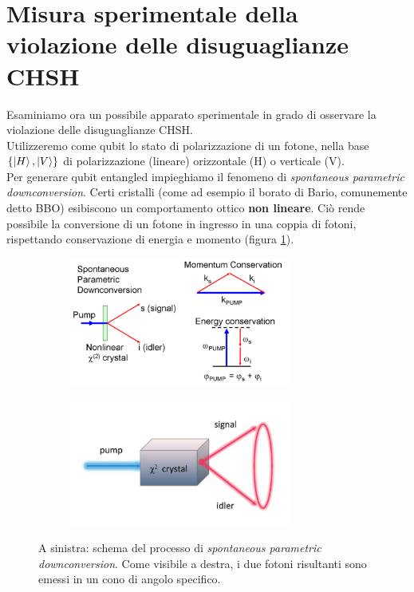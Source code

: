 \documentclass[../../InformazioneQuantistica.tex]{subfiles}
\begin{document}
\section{Misura sperimentale della violazione delle disuguaglianze CHSH}
Esaminiamo ora un possibile apparato sperimentale in grado di osservare la violazione delle disuguaglianze CHSH.\\
Utilizzeremo come qubit lo stato di polarizzazione di un fotone, nella base $\{\Ket{H},\Ket{V}\}$ di polarizzazione (lineare) orizzontale (H) o verticale (V).\\
Per generare qubit entangled impieghiamo il fenomeno di \textit{spontaneous parametric downconversion}. Certi cristalli (come ad esempio il borato di Bario, comunemente detto BBO) esibiscono un comportamento ottico \textbf{non lineare}. Ciò rende possibile la conversione di un fotone in ingresso in una coppia di fotoni, rispettando conservazione di energia e momento (figura \ref{fig:spdc}).

\begin{figure}[H]
    \centering
    \begin{subfigure}[t]{0.5\textwidth}
        \centering
        \includegraphics[width=0.8\textwidth]{Immagini/28_3/spdc_1.PNG}
    \end{subfigure}%
    \begin{subfigure}[t]{0.5\textwidth}
        \centering
        \includegraphics[width=0.8\textwidth]{Immagini/28_3/spdc_2.PNG}
    \end{subfigure}
    \caption{A sinistra: schema del processo di \textit{spontaneous parametric downconversion}. Come visibile a destra, i due fotoni risultanti sono emessi in un cono di angolo specifico.}
    \label{fig:spdc}
\end{figure}
\end{document}
